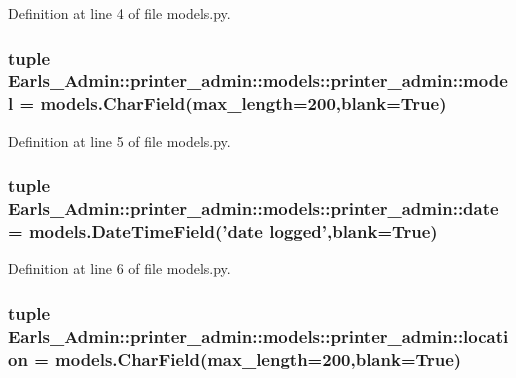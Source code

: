 Definition at line 4 of file models.py.\hypertarget{classEarls__Admin_1_1printer__admin_1_1models_1_1printer__admin_6dec8ea6be11a2cefcd550d6f739163b}{
\subsubsection[model]{\setlength{\rightskip}{0pt plus 5cm}tuple {\bf Earls\_\-Admin::printer\_\-admin::models::printer\_\-admin::model} = models.CharField(max\_\-length=200,blank=True)}}
\label{classEarls__Admin_1_1printer__admin_1_1models_1_1printer__admin_6dec8ea6be11a2cefcd550d6f739163b}




Definition at line 5 of file models.py.\hypertarget{classEarls__Admin_1_1printer__admin_1_1models_1_1printer__admin_d96a8c1b01806a9c78531fa676453f5b}{
\subsubsection[date]{\setlength{\rightskip}{0pt plus 5cm}tuple {\bf Earls\_\-Admin::printer\_\-admin::models::printer\_\-admin::date} = models.DateTimeField('{\bf date} logged',blank=True)}}
\label{classEarls__Admin_1_1printer__admin_1_1models_1_1printer__admin_d96a8c1b01806a9c78531fa676453f5b}




Definition at line 6 of file models.py.\hypertarget{classEarls__Admin_1_1printer__admin_1_1models_1_1printer__admin_141bb680a7441a5d68e032d467b1d742}{
\subsubsection[location]{\setlength{\rightskip}{0pt plus 5cm}tuple {\bf Earls\_\-Admin::printer\_\-admin::models::printer\_\-admin::location} = models.CharField(max\_\-length=200,blank=True)}}
\label{classEarls__Admin_1_1printer__admin_1_1models_1_1printer__admin_141bb680a7441a5d68e032d467b1d742}




